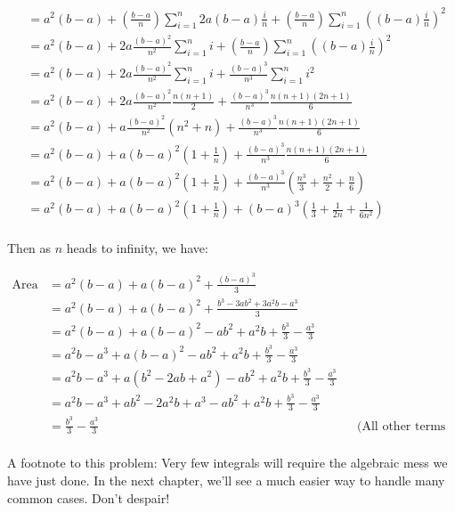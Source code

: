 \documentclass{book}
\begin{document}
\begin{align*}
&= a^2(b-a)  + \left(\frac{b-a}{n}\right) \sum_{i=1}^n 2a(b-a)\frac{i}{n} + \left(\frac{b-a}{n}\right) \sum_{i=1}^n \left((b-a)\frac{i}{n}\right)^2 \\
&= a^2(b-a) + 2a \frac{(b-a)^2}{n^2} \sum_{i=1}^n i + \left(\frac{b-a}{n}\right) \sum_{i=1}^n \left((b-a)\frac{i}{n}\right)^2 \\
&= a^2(b-a) + 2a \frac{(b-a)^2}{n^2} \sum_{i=1}^n i + \frac{(b-a)^3}{n^3} \sum_{i=1}^n i^2 \\
&= a^2(b-a) + 2a \frac{(b-a)^2}{n^2} \frac{n(n+1)}{2} + \frac{(b-a)^3}{n^3} \frac{n(n+1)(2n+1)}{6} \\
&= a^2(b-a) + a \frac{(b-a)^2}{n^2} (n^2 + n) + \frac{(b-a)^3}{n^3} \frac{n(n+1)(2n+1)}{6} \\
&= a^2(b-a) + a(b-a)^2 \left(1 + \frac{1}{n}\right) + \frac{(b-a)^3}{n^3} \frac{n(n+1)(2n+1)}{6} \\
&= a^2(b-a) + a(b-a)^2 \left(1 + \frac{1}{n}\right) + \frac{(b-a)^3}{n^3} \left( \frac{n^3}{3} + \frac{n^2}{2} + \frac{n}{6} \right) \\
&= a^2(b-a) + a(b-a)^2 \left(1 + \frac{1}{n}\right) + (b-a)^3 \left( \frac{1}{3} + \frac{1}{2n} + \frac{1}{6n^2} \right) \\
\end{align*}

Then as $n$ heads to infinity, we have:

\begin{align*}
\text{Area} &= a^2(b-a) + a(b-a)^2 + \frac{(b-a)^3}{3} \\
&= a^2(b-a) + a(b-a)^2 + \frac{b^3 - 3ab^2 + 3a^2b - a^3}{3} \\
&= a^2(b-a) + a(b-a)^2 - ab^2 + a^2b + \frac{b^3}{3} - \frac{a^3}{3} \\
&= a^2b-a^3 + a(b-a)^2 - ab^2 + a^2b + \frac{b^3}{3} - \frac{a^3}{3} \\
&= a^2b-a^3 + a(b^2-2ab+a^2) - ab^2 + a^2b + \frac{b^3}{3} - \frac{a^3}{3} \\
&= a^2b-a^3 + ab^2-2a^2b+a^3 - ab^2 + a^2b + \frac{b^3}{3} - \frac{a^3}{3} \\
&= \frac{b^3}{3} - \frac{a^3}{3} && \text{(All other terms cancel out!)} \\
\end{align*}

A footnote to this problem: Very few integrals will require the algebraic mess we have just done. In the next chapter, we'll see a much easier way to handle many common cases. Don't despair!
\end{document}
